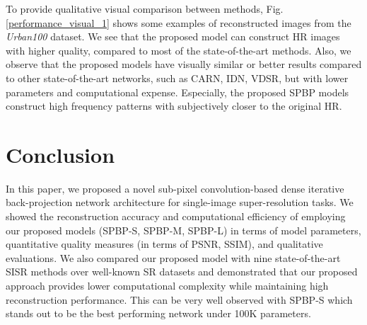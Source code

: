 \documentclass[a4paper,11pt]{article}
\begin{document}
To provide qualitative visual comparison between methods, Fig. \ref{performance_visual_1} shows some examples of reconstructed images from the \textit{Urban100} dataset. We see that the proposed model can construct HR images with higher quality, compared to most of the state-of-the-art methods. Also, we observe that the proposed models have visually similar or better results compared to other state-of-the-art networks, such as CARN, IDN, VDSR, but with lower parameters and computational expense. Especially, the proposed SPBP models construct high frequency patterns with subjectively closer to the original HR. 




















 \vspace{-1 mm}
\section{Conclusion}
\label{conclusion}
\vspace{-2 mm}
In this paper, we proposed a novel sub-pixel convolution-based dense iterative back-projection network architecture for single-image super-resolution tasks. We showed the reconstruction accuracy and computational efficiency of employing our proposed models (SPBP-S, SPBP-M,  SPBP-L) in terms of model parameters, quantitative quality measures (in terms of PSNR, SSIM), and qualitative evaluations. We also compared our proposed model with nine state-of-the-art SISR methods over well-known SR datasets and demonstrated that our proposed approach provides lower computational complexity while maintaining high reconstruction performance. This can be very well observed with SPBP-S which stands out to be the best performing network under 100K parameters.



%
 


\footnotesize


\end{document}
